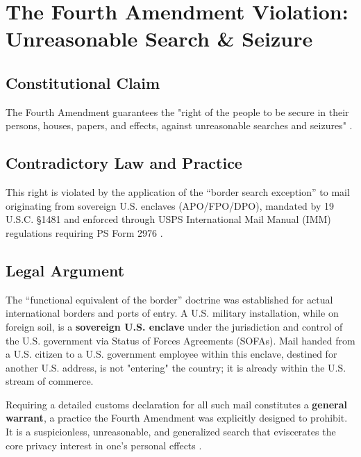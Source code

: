 ﻿\section{The Fourth Amendment Violation: Unreasonable Search \& Seizure}

\subsection{Constitutional Claim}
The Fourth Amendment guarantees the "right of the people to be secure in their persons, houses, papers, and effects, against unreasonable searches and seizures" \cite{usconstitution}.

\subsection{Contradictory Law and Practice}
This right is violated by the application of the ``border search exception'' to mail originating from sovereign U.S. enclaves (APO/FPO/DPO), mandated by 19 U.S.C. \S 1481 \cite{uscustomsstatute} and enforced through USPS International Mail Manual (IMM) regulations requiring PS Form 2976 \cite{uspsimm}.

\subsection{Legal Argument}
The ``functional equivalent of the border'' doctrine \cite{ramsey1977} was established for actual international borders and ports of entry. A U.S. military installation, while on foreign soil, is a \textbf{sovereign U.S. enclave} under the jurisdiction and control of the U.S. government via Status of Forces Agreements (SOFAs). Mail handed from a U.S. citizen to a U.S. government employee within this enclave, destined for another U.S. address, is not "entering" the country; it is already within the U.S. stream of commerce.

Requiring a detailed customs declaration for all such mail constitutes a \textbf{general warrant}, a practice the Fourth Amendment was explicitly designed to prohibit. It is a suspicionless, unreasonable, and generalized search that eviscerates the core privacy interest in one's personal effects \cite{katz1967}.

